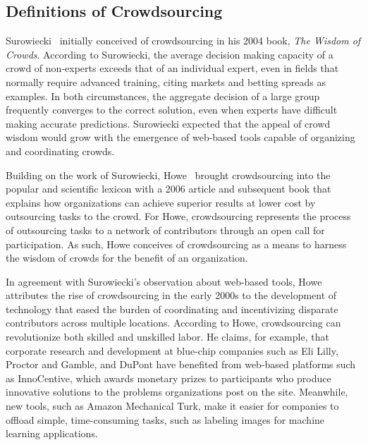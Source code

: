 \subsection{Definitions of Crowdsourcing}

Surowiecki~\cite{surowiecki} initially conceived of crowdsourcing in his 2004 book, \emph{The Wisdom of Crowds}. According to Surowiecki, the average decision making capacity of a crowd of non-experts exceeds that of an individual expert, even in fields that normally require advanced training, citing markets and betting spreads as examples. In both circumstances, the aggregate decision of a large group frequently converges to the correct solution, even when experts have difficult making accurate predictions. Surowiecki expected that the appeal of crowd wisdom would grow with the emergence of web-based tools capable of organizing and coordinating crowds.

Building on the work of Surowiecki, Howe~\cite{howe, howe2} brought crowdsourcing into the popular and scientific lexicon with a 2006 article and subsequent book that explains how organizations can achieve superior results at lower cost by outsourcing tasks to the crowd. For Howe, crowdsourcing represents the process of outsourcing tasks to a network of contributors through an open call for participation. As such, Howe conceives of crowdsourcing as a means to harness the wisdom of crowds for the benefit of an organization. 

In agreement with Surowiecki's observation about web-based tools, Howe~\cite{howe} attributes the rise of crowdsourcing in the early 2000s to the development of technology that eased the burden of coordinating and incentivizing disparate contributors across multiple locations. According to Howe, crowdsourcing can revolutionize both skilled and unskilled labor. He claims, for example, that corporate research and development at blue-chip companies such as Eli Lilly, Proctor and Gamble, and DuPont have benefited from web-based platforms such as InnoCentive, which awards monetary prizes to participants who produce innovative solutions to the problems organizations post on the site. Meanwhile, new tools, such as Amazon Mechanical Turk, make it easier for companies to offload simple, time-consuming tasks, such as labeling images for machine learning applications.

